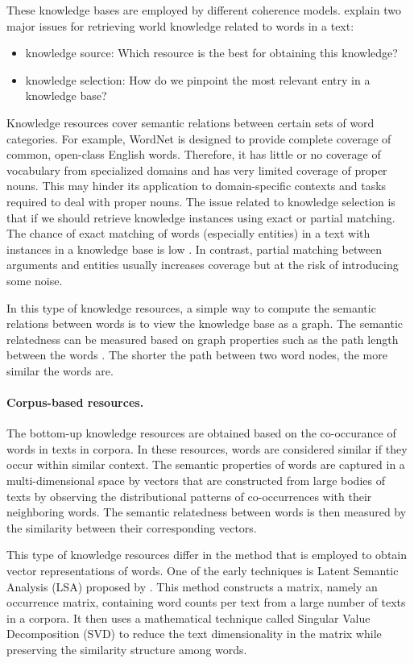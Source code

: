 These knowledge bases are employed by different coherence models.  
 explain two major issues for retrieving world knowledge related to words in a text: 
\begin{itemize}
\item knowledge source: Which resource is the best for obtaining this knowledge? 
\item knowledge selection: How do we pinpoint the most relevant entry in a knowledge base?
\end{itemize}
Knowledge resources cover semantic relations between certain sets of word categories.  
For example, WordNet is designed to provide complete coverage of common, open-class English words. 
Therefore, it has little or no coverage of vocabulary from specialized domains and has very limited coverage of proper nouns. 
This may hinder its application to domain-specific contexts and tasks required to deal with proper nouns. 
The issue related to knowledge selection is that if we should retrieve knowledge instances using exact or partial matching. 
The chance of exact matching of words (especially entities) in a text with instances in a knowledge base is low \cite{zhangmuyu15}. 
In contrast, partial matching between arguments and entities usually increases coverage but at the risk of introducing some noise. 

In this type of knowledge resources, a simple way to compute the semantic relations between words is to view the knowledge base as a graph. 
The semantic relatedness can be measured based on graph properties such as the path length between the words \cite{budanitsky06}. 
The shorter the path between two word nodes, the more similar the words are. 

\paragraph{Corpus-based resources.} 
The bottom-up knowledge resources are obtained based on the co-occurance of words in texts in corpora. 
In these resources, words are considered similar if they occur within similar context. 
The semantic properties of words are captured in a \mbox{multi-dimensional} space by vectors that are constructed from large bodies of texts by observing the distributional patterns of co-occurrences with their neighboring words. 
The semantic relatedness between words is then measured by the similarity between their corresponding vectors. 

This type of knowledge resources differ in the method that is employed to obtain vector representations of words. 
One of the early techniques is Latent Semantic Analysis (LSA) proposed by . 
This method constructs a matrix, namely an occurrence matrix, containing word counts per text from a large number of texts in a corpora.  
It then uses a mathematical technique called Singular Value Decomposition (SVD) \cite{furnas88} to reduce the text dimensionality in the matrix while preserving the similarity structure among words. 

